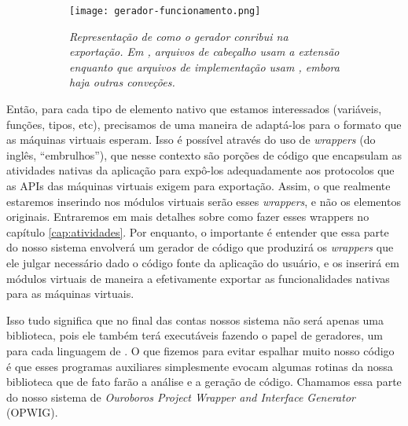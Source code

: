     \begin{figure}[ht]
      \centering
      \caption{}
      \begin{subfigure}{.8\textwidth}
        \begin{center}
          \texttt{[image: gerador-funcionamento.png]}
          \vspace{1em}

          \textit{
            Representação de como o gerador conribui na exportação.
            Em \CXX{}, arquivos de cabeçalho usam a extensão  enquanto
            que arquivos de implementação usam , embora haja outras
            conveções.
          }
        \end{center}
      \end{subfigure}
      \label{fig:gerador-funcionamento}
    \end{figure}

    Então, para cada tipo de elemento nativo que estamos interessados
    (variáveis, funções, tipos, etc), precisamos de uma maneira de adaptá-los
    para o formato que as máquinas virtuais esperam. Isso é possível através do
    uso de \textit{wrappers} (do inglês, ``embrulhos''), que nesse contexto são
    porções de código que encapsulam as atividades nativas da aplicação para
    expô-los adequadamente aos protocolos que as APIs das máquinas virtuais
    exigem para exportação. Assim, o que realmente estaremos inserindo nos
    módulos virtuais serão esses \textit{wrappers}, e não os elementos
    originais. Entraremos em mais detalhes sobre como fazer esses wrappers no
    capítulo \ref{cap:atividades}. Por enquanto, o importante é entender que
    essa parte do nosso sistema envolverá um gerador de código que produzirá
    os \textit{wrappers} que ele julgar necessário dado o código fonte da
    aplicação do usuário, e os inserirá em módulos virtuais de maneira a
    efetivamente exportar as funcionalidades nativas para as máquinas virtuais.

    Isso tudo significa que no final das contas nossos sistema não será apenas
    uma biblioteca, pois ele também terá executáveis fazendo o papel de
    geradores, um para cada linguagem de \script{}. O que fizemos para evitar
    espalhar muito nosso código é que esses programas auxiliares simplesmente
    evocam algumas rotinas da nossa biblioteca que de fato farão a análise e
    a geração de código. Chamamos essa parte do nosso sistema de \emph{Ouroboros
    Project Wrapper and Interface Generator} (OPWIG).

